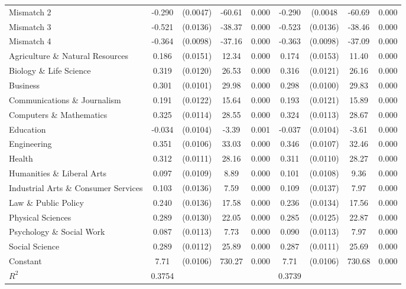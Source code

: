 \documentclass[11pt]{article}
\theoremstyle{definition}
\begin{document}
{\begin{center}
\begin{tabular}{l c c c c c c c c}
Mismatch 2 & -0.290 & (0.0047) & -60.61 & 0.000 & -0.290 & (0.0048 & -60.69 & 0.000 \\
Mismatch 3 & -0.521 & (0.0136) & -38.37 & 0.000 & -0.523 & (0.0136) & -38.46 & 0.000 \\
Mismatch 4 & -0.364 & (0.0098) & -37.16 & 0.000 & -0.363 & (0.0098) & -37.09 & 0.000 \\
Agriculture \& Natural Resources & 0.186 & (0.0151) & 12.34 & 0.000 & 0.174 & (0.0153) & 11.40 & 0.000 \\
Biology \& Life Science & 0.319 & (0.0120) & 26.53 & 0.000 & 0.316 & (0.0121) & 26.16 & 0.000 \\
Business & 0.301 & (0.0101) & 29.98 & 0.000 & 0.298 & (0.0100) & 29.83 & 0.000 \\
Communications \& Journalism & 0.191 & (0.0122) & 15.64 & 0.000 & 0.193 & (0.0121) & 15.89 & 0.000 \\
Computers \& Mathematics & 0.325 & (0.0114) & 28.55 & 0.000  & 0.324 & (0.0113) & 28.67 & 0.000 \\
Education & -0.034 & (0.0104) & -3.39 & 0.001  & -0.037 & (0.0104) & -3.61 & 0.000 \\
Engineering & 0.351 & (0.0106) & 33.03 & 0.000 & 0.346 & (0.0107) & 32.46 & 0.000 \\
Health & 0.312 & (0.0111) & 28.16 & 0.000 & 0.311 & (0.0110) & 28.27 & 0.000 \\
Humanities \& Liberal Arts & 0.097 & (0.0109) & 8.89 & 0.000 & 0.101 & (0.0108) & 9.36 & 0.000 \\
Industrial Arts \& Consumer Services & 0.103 & (0.0136) & 7.59 & 0.000 & 0.109 & (0.0137) & 7.97 & 0.000 \\
Law \& Public Policy & 0.240 & (0.0136) & 17.58 & 0.000 & 0.236 & (0.0134) & 17.56 & 0.000 \\
Physical Sciences & 0.289 & (0.0130) & 22.05 & 0.000 & 0.285 & (0.0125) & 22.87 & 0.000 \\
Psychology \& Social Work & 0.087 & (0.0113) & 7.73 & 0.000 & 0.090 & (0.0113) & 7.97 & 0.000 \\
Social Science & 0.289 & (0.0112) & 25.89 & 0.000 & 0.287 & (0.0111) & 25.69 & 0.000 \\
Constant & 7.71 & (0.0106) & 730.27 & 0.000 & 7.71 & (0.0106) & 730.68 & 0.000 \\
\hline
$R^2$ & 0.3754 & & & & 0.3739 & & \\
\hline\hline
\end{tabular} 
\end{center}} 
\end{document}
